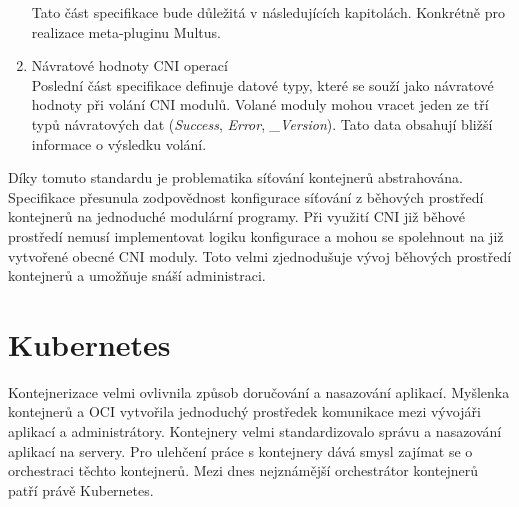 \begin{enumerate}
    Tato část specifikace bude důležitá v následujících kapitolách. Konkrétně pro realizace meta-pluginu Multus.
    \item Návratové hodnoty CNI operací\\
    Poslední část specifikace definuje datové typy, které se souží jako návratové hodnoty při volání CNI modulů. Volané moduly mohou vracet jeden ze tří typů návratových dat (\textit{Success}, \textit{Error}, \textit{\_Version}). Tato data obsahují bližší informace o výsledku volání.  
\end{enumerate}

Díky tomuto standardu je problematika síťování kontejnerů abstrahována. Specifikace přesunula zodpovědnost konfigurace síťování z běhových prostředí kontejnerů na jednoduché modulární programy. Při využití CNI již běhové prostředí nemusí implementovat logiku konfigurace a mohou se spolehnout na již vytvořené obecné CNI moduly. Toto velmi zjednodušuje vývoj běhových prostředí kontejnerů a umožňuje snáší administraci. \cite{thekubernetesauthors_2023_container}
\section{Kubernetes}
Kontejnerizace velmi ovlivnila způsob doručování a nasazování aplikací. Myšlenka kontejnerů a OCI vytvořila jednoduchý prostředek komunikace mezi vývojáři aplikací a administrátory. Kontejnery velmi standardizovalo správu a nasazování aplikací na servery. Pro ulehčení práce s kontejnery dává smysl zajímat se o orchestraci těchto kontejnerů. Mezi dnes nejznámější orchestrátor kontejnerů patří právě Kubernetes. \cite{goldberg_2019_workflow}



